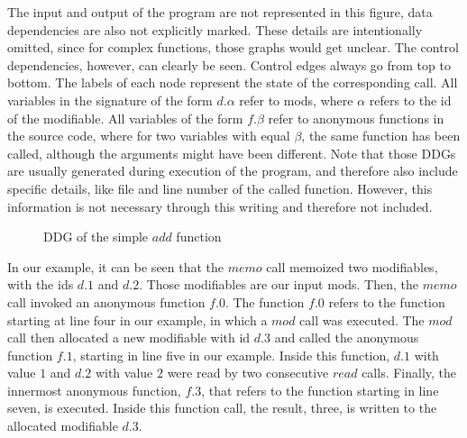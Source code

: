 The input and output of the program are not represented in this figure, data dependencies are also not explicitly marked. These details are intentionally omitted, since for complex functions, those graphs would get unclear. The control dependencies, however, can clearly be seen. Control edges always go from top to bottom. The labels of each node represent the state of the corresponding call. All variables in the signature of the form $d.\alpha$ refer to mods, where $\alpha$ refers to the id of the modifiable. All variables of the form $f.\beta$ refer to anonymous functions in the source code, where for two variables with equal $\beta$, the same function has been called, although the arguments might have been different. Note that those DDGs are usually generated during execution of the program, and therefore also include specific details, like file and line number of the called function. However, this information is not necessary through this writing and therefore not included. 

\begin{figure}
\centering
{}
\caption{DDG of the simple $add$ function}
\label{fig:add_ddg}
\end{figure}

In our example, it can be seen that the $memo$ call memoized two modifiables, with the ids $d.1$ and $d.2$. Those modifiables are our input mods. Then, the $memo$ call invoked an anonymous function $f.0$. The function $f.0$ refers to the function starting at line four in our example, in which a $mod$ call was executed. The $mod$ call then allocated a new modifiable with id $d.3$ and called the anonymous function $f.1$, starting in line five in our example. Inside this function, $d.1$ with value $1$ and $d.2$ with value $2$ were read by two consecutive $read$ calls. Finally, the innermost anonymous function, $f.3$, that refers to the function starting in line seven, is executed. Inside this function call, the result, three, is written to the allocated modifiable $d.3$. 

